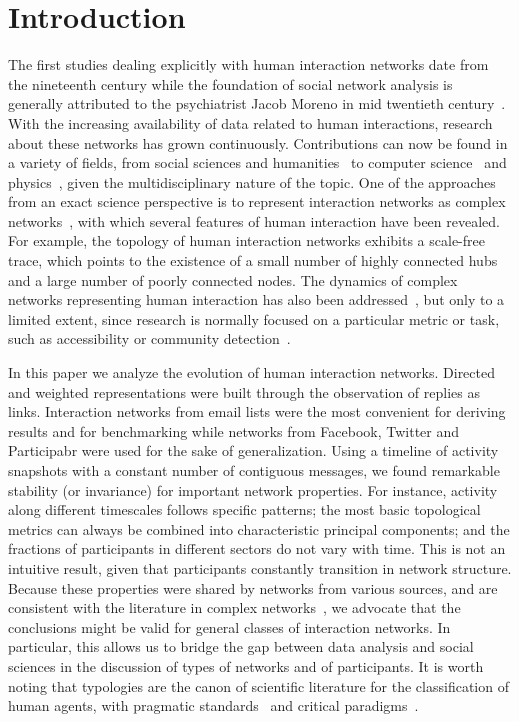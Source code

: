 \documentclass[%
aip,
jmp,%
amsmath,amssymb,
reprint,%
]{revtex4-1}
\begin{document}
\section{Introduction}\label{sec:into}
The first studies dealing explicitly with human interaction networks
date from the nineteenth century while the foundation of
social network analysis is generally attributed to the psychiatrist Jacob Moreno in mid twentieth century~\cite{moreno,newmanBook}. With the increasing availability of data related to human interactions, research about these networks has grown continuously. Contributions can now be found in a variety of fields, from social sciences and humanities~\cite{latour2013} to computer science~\cite{bird} and physics~\cite{barabasiHumanDyn,newmanFriendship}, given the multidisciplinary nature of the topic. One of the approaches from an exact science perspective is to represent interaction networks as complex networks~\cite{barabasiHumanDyn,newmanFriendship}, with which 
several features of human interaction have been revealed. For example, the topology of human interaction networks exhibits a scale-free trace, which points to the existence of a small number of highly connected hubs and a large number of poorly connected nodes. The dynamics of complex networks representing human interaction has also been addressed~\cite{barabasiEvo,newmanEvolving}, but only to a limited extent, since research is normally focused on a particular metric or task, such as accessibility or community detection~\cite{access,newmanModularity}. 

In this paper we analyze the evolution of human interaction networks.
Directed and weighted representations were built through the observation of replies as links.
Interaction networks from email lists were the most convenient for deriving results and for benchmarking while networks from Facebook, Twitter and Participabr were used for the sake of generalization.
Using a timeline of activity snapshots with a constant number of contiguous messages, we found remarkable stability (or invariance) for important network properties. For instance, activity along different timescales follows specific patterns; the most basic topological metrics can always be combined into characteristic principal components; and the fractions of participants in different sectors do not vary with time. This is not an intuitive result, given that participants constantly transition in network structure. Because these properties were shared by networks from various sources, and are consistent with the literature in complex networks~\cite{newmanBook}, we advocate that the conclusions might be valid for general classes of interaction networks. In particular, this allows us to 
bridge the gap between data analysis and social sciences in the discussion of types of networks and of participants.
It is worth noting that typologies are the canon of scientific literature for the classification of human agents, with pragmatic standards~\cite{myers} and critical paradigms~\cite{adorno,typCanon}. 
\end{document}
